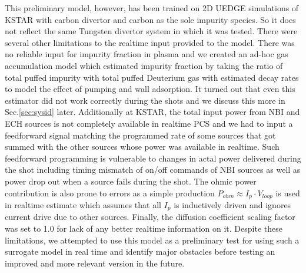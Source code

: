 This preliminary model, however, has been trained on 2D UEDGE simulations of KSTAR with carbon divertor and carbon as the sole impurity species.
So it does not reflect the same Tungsten divertor system in which it was tested.
There were several other limitations to the realtime input provided to the model.
There was no reliable input for impurity fraction in plasma and we created an ad-hoc gas accumulation model which estimated impurity fraction by taking the ratio of total puffed impurity with total puffed Deuterium gas with estimated decay rates to model the effect of pumping and wall adsorption.
It turned out that even this estimator did not work correctly during the shots and we discuss this more in Sec.\ref{sec:sysid} later.
Additionally at KSTAR, the total input power from NBI and ECH sources is not completely available in realtime PCS and we had to input a feedforward signal matching the programmed rate of some sources that got summed with the other sources whose power was available in realtime.
Such feedforward programming is vulnerable to changes in actal power delivered during the shot including timing mismatch of on/off commands of NBI sources as well as power drop out when a source fails during the shot.
The ohmic power contribution is also prone to errors as a simple production $P_{ohm} \approx I_p \cdot V_{loop}$ is used in realtime estimate which assumes that all $I_p$ is inductively driven and ignores current drive due to other sources.
Finally, the diffusion coefficient scaling factor was set to 1.0 for lack of any better realtime information on it.
Despite these limitations, we attempted to use this model as a preliminary test for using such a surrogate model in real time and identify major obstacles before testing an improved and more relevant version in the future.
